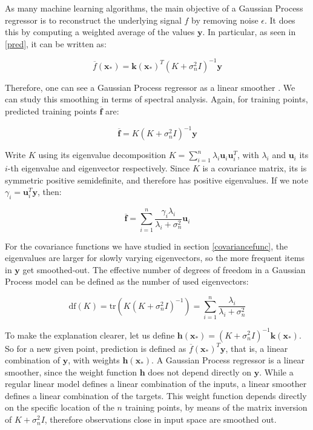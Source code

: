 \documentclass[10pt,a4paper,twoside]{book}
\begin{document}
As many machine learning algorithms, the main objective of a Gaussian Process regressor is to reconstruct the underlying signal $f$ by removing noise $\epsilon$. It does this by computing a weighted average of the values $\boldsymbol{y}$. In particular, as seen in \ref{pred}, it can be written as:

\begin{equation}
\overline{f}(\boldsymbol{x}_*) = \boldsymbol{k}(\boldsymbol{x}_*)^T(K + \sigma_n^2 I)^{-1}\boldsymbol{y}
\end{equation}

Therefore, one can see a Gaussian Process regressor as a linear smoother \cite{BUJA1989}. We can study this smoothing in terms of spectral analysis. Again, for training points, predicted training points $\overline{\boldsymbol{f}}$ are:

\begin{equation}
\overline{\boldsymbol{f}} = K(K + \sigma_n^2 I)^{-1}\boldsymbol{y}
\end{equation}

Write $K$ using its eigenvalue decomposition $K = \sum_{i=1}^n \lambda_i \boldsymbol{u}_i\boldsymbol{u}_i^T$, with $\lambda_i$ and $\boldsymbol{u}_i$ its $i$-th eigenvalue and eigenvector respectively. Since $K$ is a covariance matrix, its is symmetric positive semidefinite, and therefore has positive eigenvalues. If we note $\gamma_i = \boldsymbol{u}_i^T\boldsymbol{y}$, then:

\begin{equation}
\overline{\boldsymbol{f}} = \sum_{i=1}^n \dfrac{\gamma_i \lambda_i}{\lambda_i + \sigma^2_n}\boldsymbol{u}_i
\end{equation}

For the covariance functions we have studied in section \ref{covariancefunc}, the eigenvalues are larger for slowly varying eigenvectors, so the more frequent items in $\boldsymbol{y}$ get smoothed-out. The effective number of degrees of freedom in a Gaussian Process model can be defined as the number of used eigenvectors:

\begin{equation}
\mathrm{df}(K) = \mathrm{tr}(K(K + \sigma_n^2 I)^{-1}) = \sum_{i=1}^n\dfrac{\lambda_i}{\lambda_i + \sigma_n^2}
\end{equation}

To make the explanation clearer, let us define $\boldsymbol{h}(\boldsymbol{x}_*) = (K + \sigma_n^2 I)^{-1}\boldsymbol{k}(\boldsymbol{x}_*)$. So for a new given point, prediction is defined as $\overline{f}(\boldsymbol{x}_*)^T \boldsymbol{y}$, that is, a linear combination of $\boldsymbol{y}$, with weights $\boldsymbol{h}(\boldsymbol{x}_*)$. A Gaussian Process regressor is a linear smoother, since the weight function $\boldsymbol{h}$ does not depend directly on $\boldsymbol{y}$. While a regular linear model defines a linear combination of the inputs, a linear smoother defines a linear combination of the targets. This weight function depends directly on the specific location of the $n$ training points, by means of the matrix inversion of $K + \sigma_n^2 I$, therefore observations close in input space are smoothed out.
\end{document}
